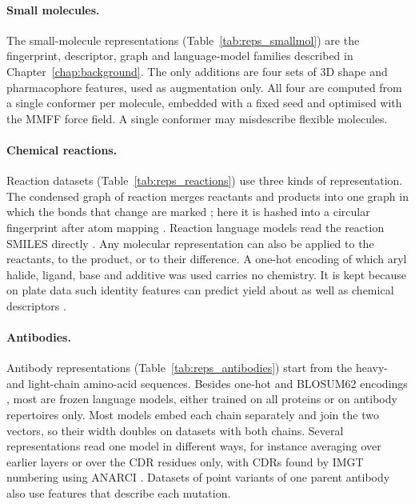 \paragraph{Small molecules.} The small-molecule representations (Table~\ref{tab:reps_smallmol}) are the fingerprint, descriptor, graph and language-model families described in Chapter~\ref{chap:background}. The only additions are four sets of 3D shape and pharmacophore features, used as augmentation only. All four are computed from a single conformer per molecule, embedded with a fixed seed and optimised with the MMFF force field. A single conformer may misdescribe flexible molecules.

\paragraph{Chemical reactions.} Reaction datasets (Table~\ref{tab:reps_reactions}) use three kinds of representation. The condensed graph of reaction merges reactants and products into one graph in which the bonds that change are marked \citep{Hoonakker2011}; here it is hashed into a circular fingerprint after atom mapping \citep{Schwaller2021rxnmapper}. Reaction language models read the reaction SMILES directly \citep{Schwaller2021rxnfp, Sagawa2023ReactionT5}. Any molecular representation can also be applied to the reactants, to the product, or to their difference. A one-hot encoding of which aryl halide, ligand, base and additive was used carries no chemistry. It is kept because on plate data such identity features can predict yield about as well as chemical descriptors \citep{Chuang2018}.

\paragraph{Antibodies.} Antibody representations (Table~\ref{tab:reps_antibodies}) start from the heavy- and light-chain amino-acid sequences. Besides one-hot and BLOSUM62 encodings \citep{Henikoff1992}, most are frozen language models, either trained on all proteins or on antibody repertoires only. Most models embed each chain separately and join the two vectors, so their width doubles on datasets with both chains. Several representations read one model in different ways, for instance averaging over earlier layers or over the CDR residues only, with CDRs found by IMGT numbering \citep{Lefranc2003} using ANARCI \citep{Dunbar2016ANARCI}. Datasets of point variants of one parent antibody also use features that describe each mutation.

